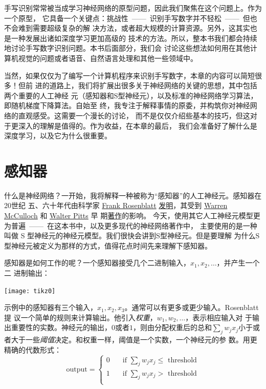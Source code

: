 手写识别常常被当成学习神经网络的原型问题，因此我们聚焦在这个问题上。作为一个原型，
它具备一个关键点：挑战性~——~识别手写数字并不轻松~——~但也不会难到需要超级复杂的解
决方法，或者超大规模的计算资源。另外，这其实也是一种发展出诸如深度学习更加高级的
技术的方法。所以，整本书我们都会持续地讨论手写数字识别问题。本书后面部分，我们会
讨论这些想法如何用在其他计算机视觉的问题或者语音、自然语言处理和其他一些领域中。

当然，如果仅仅为了编写一个计算机程序来识别手写数字，本章的内容可以简短很多！但前
进的道路上，我们将扩展出很多关于神经网络的关键的思想，其中包括两个重要的人工神经
元（感知器和S型神经元），以及标准的神经网络学习算法，即随机梯度下降算法。自始至
终，我专注于解释事情的原委，并构筑你对神经网络的直观感受。这需要一个漫长的讨论，
而不是仅仅介绍些基本的技巧，但这对于更深入的理解是值得的。作为收益，在本章的最后，
我们会准备好了解什么是深度学习，以及它为什么很重要。

\section{感知器}
\label{sec:Perceptrons}

什么是神经网络？一开始，我将解释一种被称为“感知器”的人工神经元。感知器在20世纪
五、六十年代由科学家 \href{http://en.wikipedia.org/wiki/Frank_Rosenblatt}{Frank
  Rosenblatt}
\href{http://books.google.ca/books/about/Principles_of_neurodynamics.html?id=7FhRAAAAMAAJ}{
  发明}，其受到 \href{http://en.wikipedia.org/wiki/Warren_McCulloch}{Warren
  McCulloch} 和 \href{http://en.wikipedia.org/wiki/Walter_Pitts}{Walter Pitts} 早
期\href{http://scholar.google.ca/scholar?cluster=4035975255085082870}{著作}的影响。
今天，使用其它人工神经元模型更为普遍~——~在这本书中，以及更多现代的神经网络著作中，
主要使用的是一种叫做 S 型神经元的神经元模型。我们很快会讲到S型神经元。但是要理解
为什么S型神经元被定义为那样的方式，值得花点时间先来理解下感知器。

感知器是如何工作的呢？一个感知器接受几个二进制输入，$x_1,x_2,\ldots$，并产生一个二
进制输出：
\begin{center}
  \texttt{[image: tikz0]}
\end{center}

示例中的感知器有三个输入，$x_1,x_2,x_3$。通常可以有更多或更少输入。Rosenblatt 提
议一个简单的规则来计算输出。他引入\emph{权重}，$w_1,w_2,\ldots$，表示相应输入对
于输出重要性的实数。神经元的输出，$0$或者$1$，则由分配权重后的总和$\sum_j w_j
x_j$小于或者大于一些\emph{阈值}决定。和权重一样，阈值是一个实数，一个神经元的参
数。用更精确的代数形式：
\begin{equation}
  \text{output} = \begin{cases}
    0 & \quad \text{if } \sum_j w_j x_j \leq \text{ threshold} \\
    1 & \quad \text{if } \sum_j w_j x_j > \text{ threshold} \\
  \end{cases}
  \tag{1}
\end{equation}

